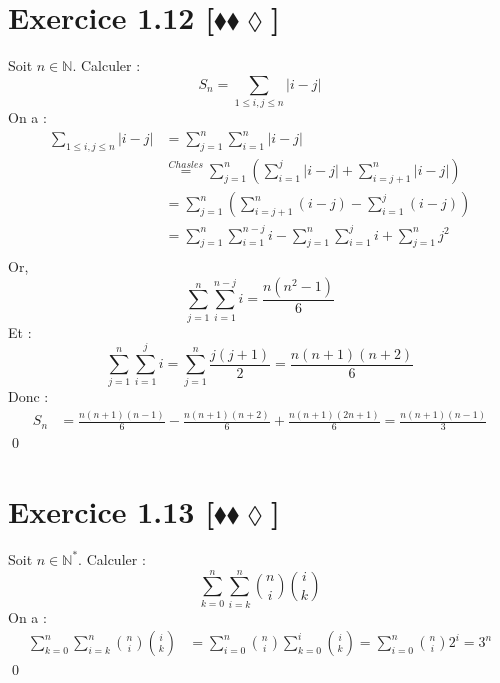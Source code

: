 \documentclass[10pt]{article}
\begin{document}
\section*{Exercice 1.12 [$\blacklozenge\blacklozenge\lozenge$]}
\begin{tcolorbox}[enhanced, width=7in, center, size=fbox, fontupper=\large, drop shadow southwest]
    Soit $n\in\mathbb{N}$. Calculer :
    \begin{equation*}
        S_n = \sum\limits_{1\leq i,j\leq n}{|i-j|}
    \end{equation*}
    On a :
    \begin{align*}
        \sum\limits_{1\leq i,j\leq n}{|i-j|}
        &=\sum\limits^{n}_{j=1}{\sum\limits^{n}_{i=1}{|i-j|}}\\
        &\stackrel{Chasles}{=}\sum\limits^{n}_{j=1}{\left(\sum\limits^{j}_{i=1}{|i-j|}+\sum\limits^{n}_{i=j+1}{|i-j|}\right)}\\
        &=\sum\limits^{n}_{j=1}{\left(\sum\limits^{n}_{i=j+1}{(i-j)}-\sum\limits^{j}_{i=1}{(i-j)}\right)}\\
        &=\sum\limits^{n}_{j=1}{\sum\limits^{n-j}_{i=1}{i}-\sum\limits^{n}_{j=1}\sum\limits^{j}_{i=1}{i}+\sum\limits^n_{j=1}j^2}\\
    \end{align*}
    Or,
    \begin{equation*}
        \sum^n_{j=1}{\sum^{n-j}_{i=1}{i}}=\frac{n(n^2-1)}{6}
    \end{equation*}
    Et :
    \begin{equation*}
        \sum^n_{j=1}\sum^j_{i=1}{i}=\sum^n_{j=1}{\frac{j(j+1)}{2}}=\frac{n(n+1)(n+2)}{6}
    \end{equation*}
    Donc :
    \begin{align*}
        S_n &= \frac{n(n+1)(n-1)}{6} - \frac{n(n+1)(n+2)}{6} + \frac{n(n+1)(2n+1)}{6} = \frac{n(n+1)(n-1)}{3}
    \end{align*}
    \qed
\end{tcolorbox}

\section*{Exercice 1.13 [$\blacklozenge\blacklozenge\lozenge$]}
\begin{tcolorbox}[enhanced, width=7in, center, size=fbox, fontupper=\large, drop shadow southwest]
    Soit $n\in\mathbb{N}^*$. Calculer :
    \begin{equation*}
        \sum^n_{k=0}\sum^n_{i=k}{\binom{n}{i}\binom{i}{k}}
    \end{equation*}
    On a :
    \begin{align*}
        \sum^n_{k=0}\sum^n_{i=k}{\binom{n}{i}\binom{i}{k}}&=\sum^n_{i=0}\binom{n}{i}\sum^i_{k=0}\binom{i}{k}=\sum^n_{i=0}\binom{n}{i}2^i=3^n
    \end{align*}
    \qed
\end{tcolorbox}
\end{document}
